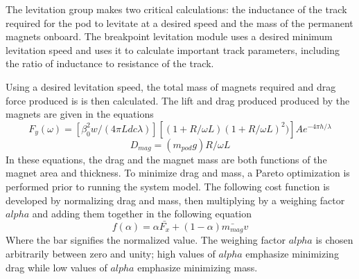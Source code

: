 	The levitation group makes two critical calculations: the inductance of the track required for the pod to levitate at a desired speed and the mass of the permanent magnets onboard. The breakpoint levitation module uses a desired minimum levitation speed and uses it to calculate important track parameters, including the ratio of inductance to resistance of the track.

	Using a desired levitation speed, the total mass of magnets required and drag force produced is is then calculated. The lift and drag produced produced by the magnets are given in the equations
	\begin{equation}
		\label{eq:fy_lev}
		F_{y}(\omega)=[\beta _{0}^{2}w/(4\pi Ldc\lambda )][( 1+R/\omega L)(1+R/\omega L)^{2})]Ae^{-4\pi h/\lambda }
	\end{equation}
	\begin{equation}
		\label{eq:dmag}
		D_{mag}=( m_{pod}g)R/\omega L
	\end{equation}
	In these equations, the drag and the magnet mass are both functions of the magnet area and thickness. To minimize drag and mass, a Pareto optimization is performed prior to running the system model. The following cost function is developed by normalizing drag and mass, then multiplying by a weighing factor $alpha$ and adding them together in the following equation
	\begin{equation}
		\label{eq:pareto}
		f(\alpha ) = \alpha \bar{F_{x}} + (1-\alpha )\bar{m_{mag}}v
	\end{equation}
	Where the bar signifies the normalized value. The weighing factor $alpha$ is chosen arbitrarily between zero and unity; high values of $alpha$ emphasize minimizing drag while low values of $alpha$ emphasize minimizing mass.




